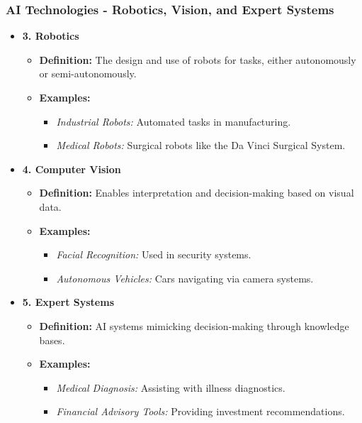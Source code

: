 \documentclass{beamer}
\begin{document}
\begin{frame}[fragile]
    \frametitle{AI Technologies - Robotics, Vision, and Expert Systems}
    \begin{itemize}
        \item \textbf{3. Robotics}
        \begin{itemize}
            \item \textbf{Definition:} The design and use of robots for tasks, either autonomously or semi-autonomously.
            \item \textbf{Examples:}
            \begin{itemize}
                \item \textit{Industrial Robots:} Automated tasks in manufacturing.
                \item \textit{Medical Robots:} Surgical robots like the Da Vinci Surgical System.
            \end{itemize}
        \end{itemize}
        
        \item \textbf{4. Computer Vision}
        \begin{itemize}
            \item \textbf{Definition:} Enables interpretation and decision-making based on visual data.
            \item \textbf{Examples:}
            \begin{itemize}
                \item \textit{Facial Recognition:} Used in security systems.
                \item \textit{Autonomous Vehicles:} Cars navigating via camera systems.
            \end{itemize}
        \end{itemize}
        
        \item \textbf{5. Expert Systems}
        \begin{itemize}
            \item \textbf{Definition:} AI systems mimicking decision-making through knowledge bases.
            \item \textbf{Examples:}
            \begin{itemize}
                \item \textit{Medical Diagnosis:} Assisting with illness diagnostics.
                \item \textit{Financial Advisory Tools:} Providing investment recommendations.
            \end{itemize}
        \end{itemize}
    \end{itemize}
\end{frame}
\end{document}
